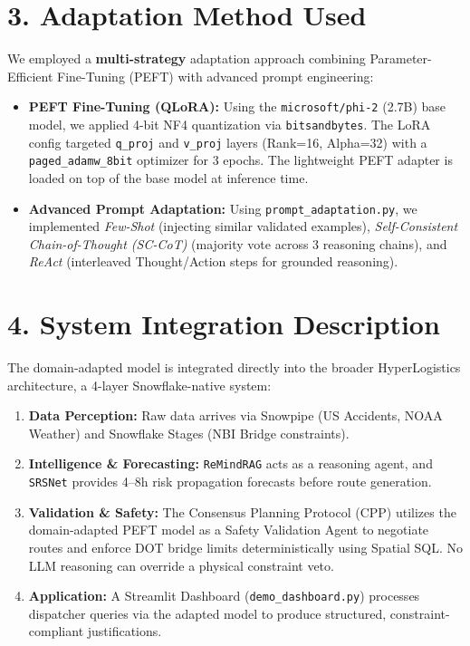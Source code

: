 \documentclass[11pt,a4paper]{article}
\begin{document}
\section*{3. Adaptation Method Used}
We employed a \textbf{multi-strategy} adaptation approach combining Parameter-Efficient Fine-Tuning (PEFT) with advanced prompt engineering:
\begin{itemize}[leftmargin=*, noitemsep]
    \item \textbf{PEFT Fine-Tuning (QLoRA):} Using the \texttt{microsoft/phi-2} (2.7B) base model, we applied 4-bit NF4 quantization via \texttt{bitsandbytes}. The LoRA config targeted \texttt{q\_proj} and \texttt{v\_proj} layers (Rank=16, Alpha=32) with a \texttt{paged\_adamw\_8bit} optimizer for 3 epochs. The lightweight PEFT adapter is loaded on top of the base model at inference time.
    \item \textbf{Advanced Prompt Adaptation:} Using \texttt{prompt\_adaptation.py}, we implemented \textit{Few-Shot} (injecting similar validated examples), \textit{Self-Consistent Chain-of-Thought (SC-CoT)} (majority vote across 3 reasoning chains), and \textit{ReAct} (interleaved Thought/Action steps for grounded reasoning).
\end{itemize}

\section*{4. System Integration Description}
The domain-adapted model is integrated directly into the broader HyperLogistics architecture, a 4-layer Snowflake-native system:
\begin{enumerate}[leftmargin=*, noitemsep]
    \item \textbf{Data Perception:} Raw data arrives via Snowpipe (US Accidents, NOAA Weather) and Snowflake Stages (NBI Bridge constraints).
    \item \textbf{Intelligence \& Forecasting:} \texttt{ReMindRAG} acts as a reasoning agent, and \texttt{SRSNet} provides 4--8h risk propagation forecasts before route generation.
    \item \textbf{Validation \& Safety:} The Consensus Planning Protocol (CPP) utilizes the domain-adapted PEFT model as a Safety Validation Agent to negotiate routes and enforce DOT bridge limits deterministically using Spatial SQL. No LLM reasoning can override a physical constraint veto.
    \item \textbf{Application:} A Streamlit Dashboard (\texttt{demo\_dashboard.py}) processes dispatcher queries via the adapted model to produce structured, constraint-compliant justifications.
\end{enumerate}
\end{document}
